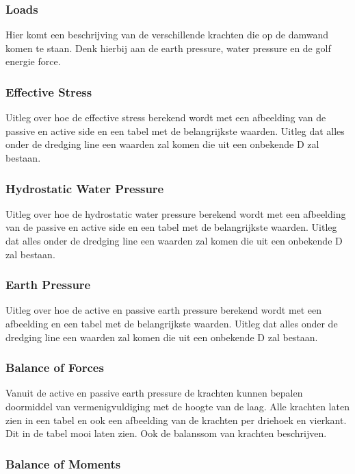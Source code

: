 \subsubsection{Loads}

Hier komt een beschrijving van de verschillende krachten die op de damwand komen te staan. Denk hierbij aan de earth pressure, water pressure en de golf energie force.

\subsubsection{Effective Stress}

Uitleg over hoe de effective stress berekend wordt met een afbeelding van de passive en active side en een tabel met de belangrijkste waarden. Uitleg dat alles onder de dredging line een waarden zal komen die uit een onbekende D zal bestaan.

\subsubsection{Hydrostatic Water Pressure}

Uitleg over hoe de hydrostatic water pressure berekend wordt met een afbeelding van de passive en active side en een tabel met de belangrijkste waarden. Uitleg dat alles onder de dredging line een waarden zal komen die uit een onbekende D zal bestaan.


\subsubsection{Earth Pressure}

Uitleg over hoe de active en passive earth pressure berekend wordt met een afbeelding en een tabel met de belangrijkste waarden. Uitleg dat alles onder de dredging line een waarden zal komen die uit een onbekende D zal bestaan. 

\subsubsection{Balance of Forces}

Vanuit de active en passive earth pressure de krachten kunnen bepalen doormiddel van vermenigvuldiging met de hoogte van de laag. Alle krachten laten zien in een tabel en ook een afbeelding van de krachten per driehoek en vierkant. Dit in de tabel mooi laten zien. Ook de balanssom van krachten beschrijven.

\subsubsection{Balance of Moments}

